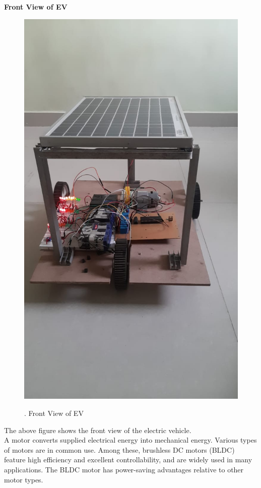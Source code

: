 \documentclass[a4paper,12pt]{article}
\begin{document}
\newpage
\textbf{Front View of EV}\\[1cm]
\begin{figure}[!h]
\centering
\includegraphics[scale=0.3]{fv.jpeg}\\
\caption{. Front View of EV}
\end{figure}

The above figure shows the front view of the electric vehicle.\\
A motor converts supplied electrical energy into mechanical energy. Various types of motors are in common use. Among these, brushless DC motors (BLDC) feature high efficiency and excellent controllability, and are widely used in many applications. The BLDC motor has power-saving advantages relative to other motor types.\\
\end{document}
